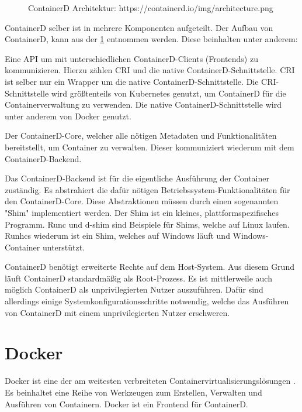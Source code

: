 \begin{figure}[H]
    \caption{ContainerD Architektur: https://containerd.io/img/architecture.png}
    \label{fig:containerd-architecture}
\end{figure}


ContainerD selber ist in mehrere Komponenten aufgeteilt. Der Aufbau von ContainerD, kann aus der \cref{fig:containerd-architecture} entnommen werden. Diese beinhalten unter anderem:

Eine API um mit unterschiedlichen ContainerD-Clients (Frontends) zu kommunizieren. Hierzu zählen CRI und die native ContainerD-Schnittstelle. CRI ist selber nur ein Wrapper um die native ContainerD-Schnittstelle. Die CRI-Schnittstelle wird größtenteils von Kubernetes genutzt, um ContainerD für die Containerverwaltung zu verwenden. Die native ContainerD-Schnittstelle wird unter anderem von Docker genutzt.

Der ContainerD-Core, welcher alle nötigen Metadaten und Funktionalitäten bereitstellt, um Container zu verwalten. Dieser kommuniziert wiederum mit dem ContainerD-Backend.

Das ContainerD-Backend ist für die eigentliche Ausführung der Container zuständig. Es abstrahiert die dafür nötigen Betriebssystem-Funktionalitäten für den ContainerD-Core. Diese Abstraktionen müssen durch einen sogenannten "Shim" implementiert werden. Der Shim ist ein kleines, plattformspezifisches Programm. Runc und d-shim sind Beispiele für Shims, welche auf Linux laufen. Runhcs wiederum ist ein Shim, welches auf Windows läuft und Windows-Container unterstützt.  

ContainerD benötigt erweiterte Rechte auf dem Host-System. Aus diesem Grund läuft ContainerD standardmäßig als Root-Prozess. Es ist mittlerweile auch möglich ContainerD als unprivilegierten Nutzer auszuführen. Dafür sind allerdings einige Systemkonfigurationsschritte notwendig, welche das Ausführen von ContainerD mit einem unprivilegierten Nutzer erschweren.



\section{Docker}

Docker ist eine der am weitesten verbreiteten Containervirtualisierungslösungen \cite{datanyzeLeadingContainerizationTechnologiesa}. Es beinhaltet eine Reihe von Werkzeugen zum Erstellen, Verwalten und Ausführen von Containern. Docker ist ein Frontend für ContainerD.

